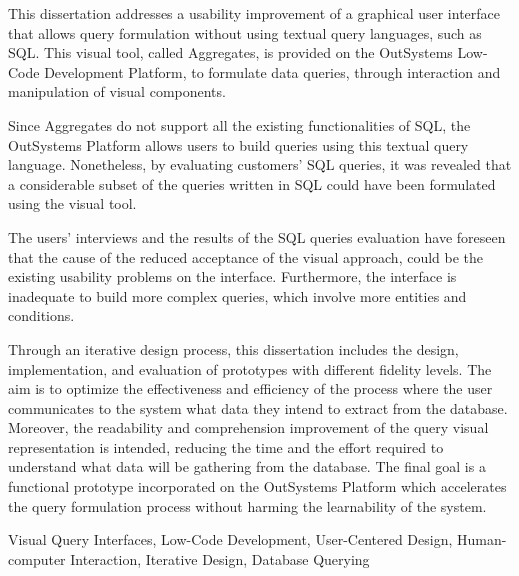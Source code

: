 This dissertation addresses a usability improvement of a graphical user interface that allows query formulation without using textual query languages, such as SQL. This visual tool, called Aggregates, is provided on the OutSystems Low-Code Development Platform, to formulate data queries, through interaction and manipulation of visual components. 

Since Aggregates do not support all the existing functionalities of SQL, the OutSystems Platform allows users to build queries using this textual query language. Nonetheless, by evaluating customers' SQL queries, it was revealed that a considerable subset of the queries written in SQL could have been formulated using the visual tool.

The users' interviews and the results of the SQL queries evaluation have foreseen that the cause of the reduced acceptance of the visual approach, could be the existing usability problems on the interface. Furthermore, the interface is inadequate to build more complex queries, which involve more entities and conditions.

Through an iterative design process, this dissertation includes the design, implementation, and evaluation of prototypes with different fidelity levels. The aim is to optimize the effectiveness and efficiency of the process where the user communicates to the system what data they intend to extract from the database. Moreover, the readability and comprehension improvement of the query visual representation is intended, reducing the time and the effort required to understand what data will be gathering from the database. The final goal is a functional prototype incorporated on the OutSystems Platform which accelerates the query formulation process without harming the learnability of the system.


\begin{keywords}
Visual Query Interfaces, Low-Code Development, User-Centered Design, Human-computer Interaction, Iterative Design, Database Querying
\end{keywords} 

